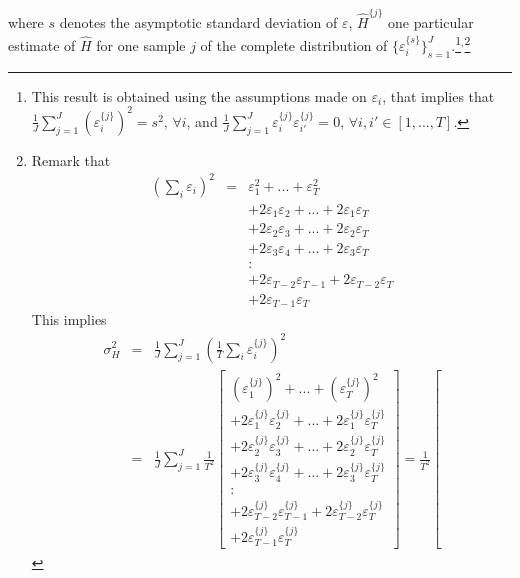 \documentclass[12pt,a4paper]{article}
\begin{document}
where $s$ denotes the asymptotic standard deviation of $\varepsilon$,  $\widehat{H}^{\{j\}}$ one particular estimate of $\widehat{H}$ for one sample $j$ of the complete distribution of $\{\varepsilon_i^{\{s\}} \}_{s=1}^J$.\footnote{This result is obtained using the assumptions made on $\varepsilon_i$, that implies that $\frac{1}{J} \sum_{j=1}^J\left(\varepsilon_i^{\{j\}}\right)^2 = s^2$, $\forall i$,  and $\frac{1}{J} \sum_{j=1}^J\varepsilon^{\{j\}}_i \varepsilon^{\{j\}}_{i'}=0$, $\forall i,i' \in [1,...,T]$. }$^{,}$\footnote{Remark that 
	\begin{eqnarray*}
		\left(\sum_i \varepsilon_i \right)^2 &=& \varepsilon_1^2 + ... + \varepsilon_T^2 \\
		& & + 2 \varepsilon_1\varepsilon_2 +...+2 \varepsilon_1\varepsilon_T \\
		& & + 2 \varepsilon_2\varepsilon_3 +...+2 \varepsilon_2\varepsilon_T \\
		& & + 2 \varepsilon_3\varepsilon_4 +...+2 \varepsilon_3\varepsilon_T \\
		& & \colon \\
		& & + 2 \varepsilon_{T-2}  \varepsilon_{T-1} + 2 \varepsilon_{T-2} \varepsilon_T\\
		& & + 2 \varepsilon_{T-1} \varepsilon_T
	\end{eqnarray*}
	This implies
	\begin{eqnarray*}
		\sigma_H^2 &=& 
		\frac{1}{J} \sum_{j=1}^J 
		\left( \frac{1}{T}\sum_i \varepsilon_i^{\{j\}} \right)^2 \\
		&=& \frac{1}{J} \sum_{j=1}^J \frac{1}{T^2}
		\left[ 
		\begin{array}{l}
			\left(\varepsilon_1^{\{j\}}\right)^2 + ... + \left(\varepsilon_T^{\{j\}}\right)^2 \\
			+ 2 \varepsilon_1^{\{j\}}\varepsilon_2^{\{j\}} +...+2 \varepsilon_1^{\{j\}}\varepsilon_T^{\{j\}} \\
			+ 2 \varepsilon_2^{\{j\}}\varepsilon_3^{\{j\}} +...+2 \varepsilon_2^{\{j\}}\varepsilon_T^{\{j\}} \\
			+ 2 \varepsilon_3^{\{j\}}\varepsilon_4^{\{j\}} +...+2 \varepsilon_3^{\{j\}}\varepsilon_T^{\{j\}} \\
			\colon \\
			+ 2 \varepsilon_{T-2}^{\{j\}}  \varepsilon_{T-1}^{\{j\}} + 2 \varepsilon_{T-2}^{\{j\}} \varepsilon_T^{\{j\}}\\
			+ 2 \varepsilon_{T-1}^{\{j\}} \varepsilon_T^{\{j\}}
		\end{array}
		\right] 
		= 
		\frac{1}{T^2}
		\left[ 

\end{eqnarray*}}
\end{document}
